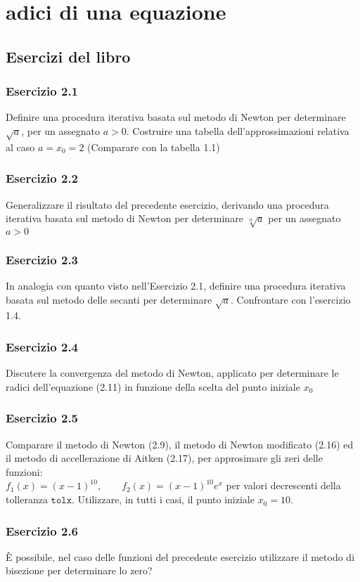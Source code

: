 \chapter{adici di una equazione}
\label{chap:adici di una equazione}
\section{Esercizi del libro}
\subsection{Esercizio 2.1}
Definire una procedura iterativa basata sul metodo di Newton per determinare $\sqrt{a}$, per un assegnato $a>0$. Costruire una tabella dell'approssimazioni relativa al caso $a=x_{0}=2$ (Comparare con la tabella 1.1)
\subsection{Esercizio 2.2}
Generalizzare il risultato del precedente esercizio, derivando una procedura iterativa basata sul metodo di Newton per determinare $\sqrt[n]{a}$ per un assegnato $a>0$
\subsection{Esercizio 2.3}
In analogia con quanto visto nell'Esercizio 2.1, definire una procedura iterativa basata sul metodo delle secanti per determinare $\sqrt{a}$. Confrontare con l'esercizio 1.4.
\subsection{Esercizio 2.4}
Discutere la convergenza del metodo di Newton, applicato per determinare le radici dell'equazione (2.11) in funzione della scelta del punto iniziale $x_{0}$
\subsection{Esercizio 2.5}
Comparare il metodo di Newton (2.9), il metodo di Newton modificato (2.16) ed il metodo di accellerazione di Aitken (2.17), per approsimare gli zeri delle funzioni:\\
\center $f_{1}(x) = (x-1)^{10}, \qquad f_{2}(x)=(x-1)^{10}e^{x} $
\flushleft per valori decrescenti della tolleranza $\mathtt{tolx}$. Utilizzare, in tutti i casi, il punto iniziale $x_{0}=10$.
\subsection{Esercizio 2.6}
È possibile, nel caso delle funzioni del precedente esercizio utilizzare il metodo di bisezione per determinare lo zero?
